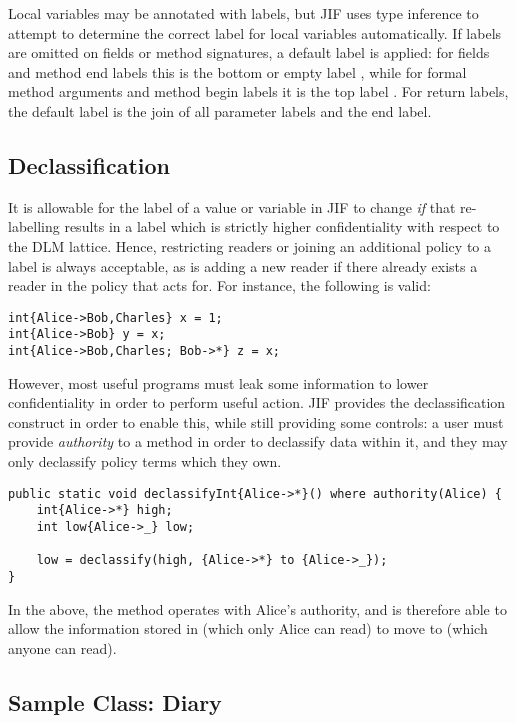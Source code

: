 Local variables may be annotated with labels, but JIF uses type inference to attempt to determine the correct label for local variables automatically. If labels are omitted on fields or method signatures, a default label is applied: for fields and method end labels this is the bottom or empty label \jiflabel{}, while for formal method arguments and method begin labels it is the top label \jiflabel{*->*}. For return labels, the default label is the join of all parameter labels and the end label.

\subsection{Declassification}

It is allowable for the label of a value or variable in JIF to change \textit{if} that re-labelling results in a label which is strictly higher confidentiality with respect to the DLM lattice. Hence, restricting readers or joining an additional policy to a label is always acceptable, as is adding a new reader  if there already exists a reader in the policy that  acts for. For instance, the following is valid:

\begin{verbatim}
int{Alice->Bob,Charles} x = 1;
int{Alice->Bob} y = x;
int{Alice->Bob,Charles; Bob->*} z = x;
\end{verbatim}

However, most useful programs must leak some information to lower confidentiality in order to perform useful action. JIF provides the declassification construct in order to enable this, while still providing some controls: a user must provide \textit{authority} to a method in order to declassify data within it, and they may only declassify policy terms which they own.

\begin{verbatim}
public static void declassifyInt{Alice->*}() where authority(Alice) {
	int{Alice->*} high;
	int low{Alice->_} low;
	
	low = declassify(high, {Alice->*} to {Alice->_});
}
\end{verbatim}

In the above, the method operates with Alice's authority, and is therefore able to allow the information stored in  (which only Alice can read) to move to  (which anyone can read).

\newpage

\subsection{Sample Class: Diary} \label{jif_bg_sample_diary}

